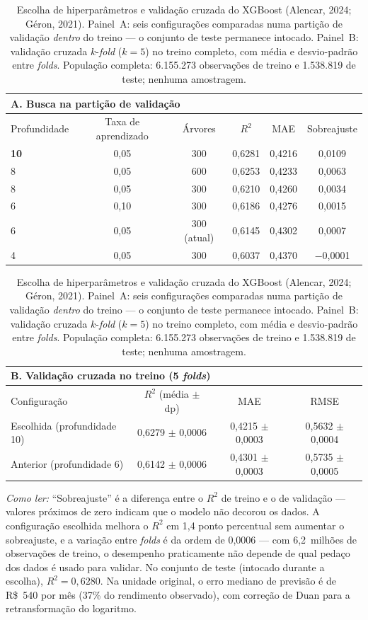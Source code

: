 \begin{table}[!ht]
\centering
\caption{Escolha de hiperparâmetros e validação cruzada do XGBoost (Alencar, 2024;
Géron, 2021). Painel~A: seis configurações comparadas numa partição de validação
\emph{dentro} do treino --- o conjunto de teste permanece intocado. Painel~B: validação
cruzada $k$-\emph{fold} ($k=5$) no treino completo, com média e
desvio-padrão entre \emph{folds}. População completa: 6.155.273 observações de
treino e 1.538.819 de teste; nenhuma amostragem.}
\label{tab:ml_cv}
\small
\begin{tabular}{lccccc}
\multicolumn{6}{l}{\textbf{A. Busca na partição de validação}} \\
\toprule
Profundidade & Taxa de aprendizado & Árvores & $R^2$ & MAE & Sobreajuste \\
\midrule
\textbf{10} & 0,05 & 300 & 0,6281 & 0,4216 & 0,0109 \\
8 & 0,05 & 600 & 0,6253 & 0,4233 & 0,0063 \\
8 & 0,05 & 300 & 0,6210 & 0,4260 & 0,0034 \\
6 & 0,10 & 300 & 0,6186 & 0,4276 & 0,0015 \\
6 & 0,05 & 300 (atual) & 0,6145 & 0,4302 & 0,0007 \\
4 & 0,05 & 300 & 0,6037 & 0,4370 & −0,0001 \\
\bottomrule
\end{tabular}

\vspace{0.6em}
\begin{tabular}{lccc}
\multicolumn{4}{l}{\textbf{B. Validação cruzada no treino (5 \emph{folds})}} \\
\toprule
Configuração & $R^2$ (média $\pm$ dp) & MAE & RMSE \\
\midrule
Escolhida (profundidade 10) & 0,6279 $\pm$ 0,0006 & 0,4215 $\pm$ 0,0003 & 0,5632 $\pm$ 0,0004 \\
Anterior (profundidade 6) & 0,6142 $\pm$ 0,0006 & 0,4301 $\pm$ 0,0003 & 0,5735 $\pm$ 0,0005 \\
\bottomrule
\end{tabular}
\normalsize
\par\smallskip
\footnotesize\emph{Como ler:} ``Sobreajuste'' é a diferença entre o $R^2$ de treino e o de
validação --- valores próximos de zero indicam que o modelo não decorou os dados. A
configuração escolhida melhora o $R^2$ em 1,4 ponto percentual sem aumentar o
sobreajuste, e a variação entre \emph{folds} é da ordem de 0,0006 --- com 6,2~milhões de
observações de treino, o desempenho praticamente não depende de qual pedaço dos dados é
usado para validar. No conjunto de teste (intocado durante a escolha), $R^2 = 0,6280$.
Na unidade original, o erro mediano de previsão é de R\$~540 por mês
(37\% do rendimento observado), com correção de Duan para a
retransformação do logaritmo.
\end{table}

